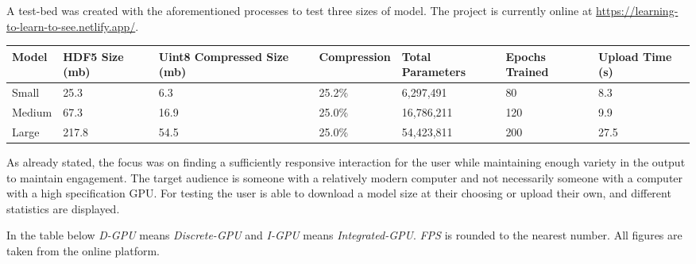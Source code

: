 \documentclass{article}
\begin{document}
A test-bed was created with the aforementioned processes to test three sizes of model. The project is currently online at \url{https://learning-to-learn-to-see.netlify.app/}. %

\begin{small}
	\begin{center}
		\begin{tabularx}{\textwidth}{bbbbbbb}
			\toprule
			Model  & HDF5 Size (mb) & Uint8 Compressed Size (mb) & Compression & Total Parameters & Epochs Trained & Upload Time (s) \\
			\midrule
			Small  & 25.3           & 6.3                        & 25.2\%      & 6,297,491        & 80             & 8.3             \\
			Medium & 67.3           & 16.9                       & 25.0\%      & 16,786,211       & 120            & 9.9             \\
			Large  & 217.8          & 54.5                       & 25.0\%      & 54,423,811       & 200            & 27.5            \\
			\bottomrule
		\end{tabularx}
		\label{table:model_details}
	\end{center}
\end{small}



As already stated, the focus was on finding a sufficiently responsive interaction for the user while maintaining enough variety in the output to maintain engagement. The target audience is someone with a relatively modern computer and not necessarily someone with a computer with a high specification GPU. For testing the user is able to download a model size at their choosing or upload their own, and different statistics are displayed.

In the table below \textit{D-GPU} means \textit{Discrete-GPU} and \textit{I-GPU} means \textit{Integrated-GPU}. \textit{FPS} is rounded to the nearest number. All figures are taken from the online platform.
\end{document}
